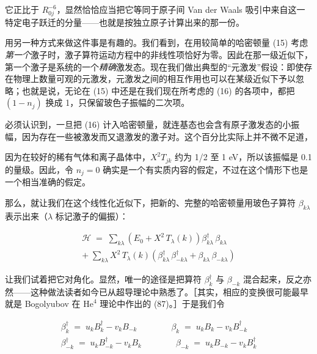 它正比于 $R_{0j}^{-6}$，显然恰恰应当把它等同于原子间 Van der Waals 吸引中来自这一特定电子跃迁的分量——也就是按独立原子计算出来的那一份。

用另一种方式来做这件事是有趣的。我们看到，在用较简单的哈密顿量 (15) 考虑\emph{第一个}激子时，激子算符运动方程中的非线性项恰好为零。因此在那一级近似下，第一个激子是系统的一个\emph{精确}激发态。现在我们做出典型的“元激发”假设：即使存在物理上数量可观的元激发，元激发之间的相互作用也可以在某级近似下予以忽略；也就是说，无论在 (15) 中还是在我们现在所考虑的 (16) 的各项中，都把 $(1-n_j)$ 换成 1，只保留玻色子振幅的二次项。

必须认识到，一旦把 (16) 计入哈密顿量，就连基态也会含有原子激发态的小振幅，因为存在一些被激发而又退激发的激子对。这个百分比实际上并不微不足道，



因为在较好的稀有气体和离子晶体中，$X^{2}T_{jk}$ 约为 1/2 至 1 eV，所以该振幅是 0.1 的量级。因此，令 $n_j = 0$ 确实是一个有实质内容的假定，不过在这个情形下也是一个相当准确的假定。

那么，就让我们在这个线性化近似下，把新的、完整的哈密顿量用玻色子算符 $\beta_{k\lambda}$ 表示出来（$\lambda$ 标记激子的偏振）：

\begin{gather*}
\mathcal{H} \;=\; \sum_{k\lambda} \left(E_0 + X^{2}\,T_{\lambda}(k)\right) \beta_{k\lambda}^{\dagger}\,\beta_{k\lambda} \\
+\;\sum_{k\lambda} X^{2}\,T_{\lambda}(k)\left(\beta_{k\lambda}^{\dagger}\,\beta_{-k\lambda}^{\dagger} + \beta_{k\lambda}\,\beta_{-k\lambda}\right) \tag{17}
\end{gather*}

让我们试着把它对角化。显然，唯一的途径是把算符 $\beta_k^{\dagger}$ 与 $\beta_{-k}$ 混合起来，反之亦然——这种做法读者如今已从超导理论中熟悉了。［其实，相应的变换很可能最早就是 Bogolyubov 在 $\mathrm{He}^{4}$ 理论中作出的 (87)。］于是我们令

\begin{gather*}
\beta_k^{\dagger} \;=\; u_k B_k^{\dagger} - v_k B_{-k} \qquad\qquad \beta_k \;=\; u_k B_k - v_k B_{-k}^{\dagger} \\
\beta_{-k}^{\dagger} \;=\; u_k B_{-k}^{\dagger} - v_k B_k \qquad\qquad \beta_{-k} \;=\; u_k B_{-k} - v_k B_k^{\dagger}
\end{gather*}

